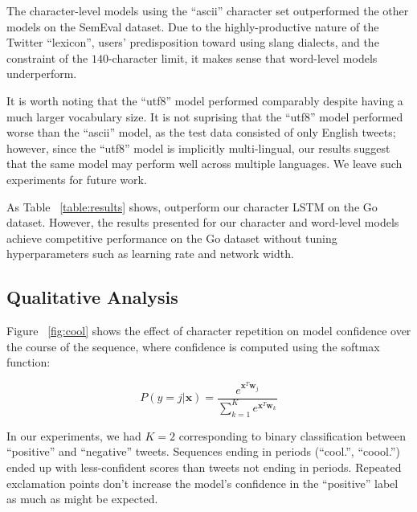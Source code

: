 \documentclass{article} %
\begin{document}
The character-level models using the ``ascii'' character set outperformed the other models on the SemEval dataset. Due to the highly-productive nature of the Twitter ``lexicon'', users' predisposition toward using slang dialects, and the constraint of the $140$-character limit, it makes sense that word-level models underperform.

It is worth noting that the ``utf8'' model performed comparably despite having a much larger vocabulary size. It is not suprising that the ``utf8'' model performed worse than the ``ascii'' model, as the test data consisted of only English tweets; however, since the ``utf8'' model is implicitly multi-lingual, our results suggest that the same model may perform well across multiple languages. We leave such experiments for future work.

As Table ~\ref{table:results} shows, \cite{kalchbrenner2014convolutional} outperform our character LSTM on the Go dataset. However, the results presented for our character and word-level models achieve competitive performance on the Go dataset without tuning hyperparameters such as learning rate and network width. 

\subsection{Qualitative Analysis}
Figure ~\ref{fig:cool} shows the effect of character repetition on model confidence over the course of the sequence, where confidence is computed using the softmax function:

$$P(y = j|\mathbf{x}) = \frac{e^{\mathbf{x}^T \mathbf{w}_j}}{\sum_{k=1}^{K} e^{\mathbf{x}^T \mathbf{w}_k}}$$

In our experiments, we had $K = 2$ corresponding to binary classification between ``positive'' and ``negative'' tweets. Sequences ending in periods (``cool.'', ``coool.'') ended up with less-confident scores than tweets not ending in periods. Repeated exclamation points don't increase the model's confidence in the ``positive'' label as much as might be expected. 
\end{document}
